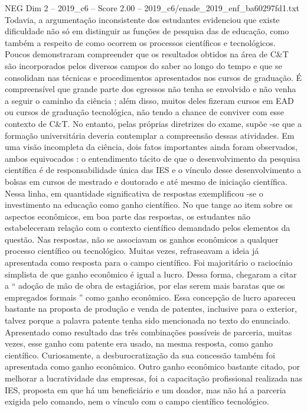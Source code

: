 \begin{textsample}{NEG Dim 2 – 2019\_c6 – Score 2.00 – 2019\_c6/enade\_2019\_enf\_ba60297fd1.txt}
Todavia, a argumentação inconsistente dos estudantes evidenciou que existe dificuldade não só em distinguir as funções de pesquisa das de educação, como também a respeito de como ocorrem os processos científicos e tecnológicos.
Poucos demonstraram compreender que os resultados obtidos na área de C\&T são incorporados pelos diversos campos do saber ao longo do tempo e que se consolidam nas técnicas e procedimentos apresentados nos cursos de graduação.
É compreensível que grande parte dos egressos não tenha se envolvido e não venha a seguir o caminho da ciência ; além disso, muitos deles fizeram cursos em EAD ou cursos de graduação tecnológica, não tendo a chance de conviver com esse contexto de C\&T.
No entanto, pelas próprias diretrizes do exame, supõe -se que a formação universitária deveria contemplar a compreensão dessas atividades.
Em uma visão incompleta da ciência, dois fatos importantes ainda foram observados, ambos equivocados : o entendimento tácito de que o desenvolvimento da pesquisa científica é de responsabilidade única das IES e o vínculo desse desenvolvimento a bolsas em cursos de mestrado e doutorado e até mesmo de iniciação científica.
Nessa linha, em quantidade significativa de respostas exemplificou -se o investimento na educação como ganho científico.
No que tange ao item sobre os aspectos econômicos, em boa parte das respostas, os estudantes não estabeleceram relação com o contexto científico demandado pelos elementos da questão.
Nas respostas, não se associavam os ganhos econômicos a qualquer processo científico ou tecnológico.
Muitas vezes, refraseavam a ideia já apresentada como resposta para o campo científico.
Foi majoritário o raciocínio simplista de que ganho econômico é igual a lucro.
Dessa forma, chegaram a citar a “ adoção de mão de obra de estagiários, por elas serem mais baratas que os empregados formais ” como ganho econômico.
Essa concepção de lucro apareceu bastante na proposta de produção e venda de patentes, inclusive para o exterior, talvez porque a palavra patente tenha sido mencionada no texto do enunciado.
Apresentado como resultado das três combinações possíveis de parceria, muitas vezes, esse ganho com patente era usado, na mesma resposta, como ganho científico.
Curiosamente, a desburocratização da sua concessão também foi apresentada como ganho econômico.
Outro ganho econômico bastante citado, por melhorar a lucratividade das empresas, foi a capacitação profissional realizada nas IES, proposta em que há um beneficiário e um doador, mas não há a parceria exigida pelo comando, nem o vínculo com o campo científico tecnológico.

\end{textsample}
